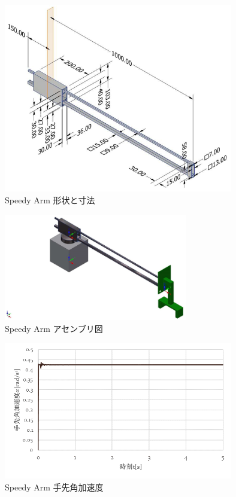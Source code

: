 \documentclass[10pt,b5paper,papersize,dvipdfmx]{jsbook}
\begin{document}
\begin{figure}[htbp]
  \centering
  \includegraphics[width=10cm]{img/robot22.png}
  \caption{Speedy Arm 形状と寸法}
  \label{fig:Speedy Arm 形状と寸法}
\end{figure}
\begin{figure}[htbp]
  \centering
  \includegraphics[width=8cm]{img/robot23.png}
  \caption{Speedy Arm アセンブリ図}
  \label{fig:Speedy Arm アセンブリ図}
\end{figure}
\begin{figure}[htbp]
  \centering
  \includegraphics[width=10cm]{img/robot24.png}
  \caption{Speedy Arm 手先角加速度}
  \label{fig:Speedy Arm 手先角加速度}
\end{figure}
\end{document}

